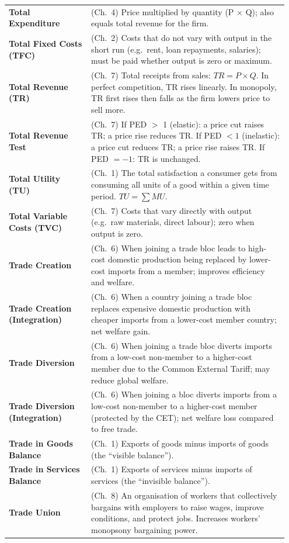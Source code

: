 \documentclass[11pt, a4paper, twoside]{book}
\begin{document}
\begin{longtable}{@{}>{\RaggedRight\arraybackslash}p{0.28\linewidth}>{\RaggedRight\arraybackslash}p{0.67\linewidth}@{}}
\textbf{Total Expenditure} & (Ch.~4) Price multiplied by quantity (P $\times$ Q); also equals total revenue for the firm. \\
\textbf{Total Fixed Costs (TFC)} & (Ch.~2) Costs that do not vary with output in the short run (e.g.\ rent, loan repayments, salaries); must be paid whether output is zero or maximum. \\
\textbf{Total Revenue (TR)} & (Ch.~7) Total receipts from sales: $TR = P \times Q$. In perfect competition, TR rises linearly. In monopoly, TR first rises then falls as the firm lowers price to sell more. \\
\textbf{Total Revenue Test} & (Ch.~7) If PED $>$ 1 (elastic): a price cut raises TR; a price rise reduces TR. If PED $< 1$ (inelastic): a price cut reduces TR; a price rise raises TR. If PED $= -1$: TR is unchanged. \\
\textbf{Total Utility (TU)} & (Ch.~1) The total satisfaction a consumer gets from consuming all units of a good within a given time period. $TU = \sum MU$. \\
\textbf{Total Variable Costs (TVC)} & (Ch.~7) Costs that vary directly with output (e.g.\ raw materials, direct labour); zero when output is zero. \\
\textbf{Trade Creation} & (Ch.~6) When joining a trade bloc leads to high-cost domestic production being replaced by lower-cost imports from a member; improves efficiency and welfare. \\
\textbf{Trade Creation (Integration)} & (Ch.~6) When a country joining a trade bloc replaces expensive domestic production with cheaper imports from a lower-cost member country; net welfare gain. \\
\textbf{Trade Diversion} & (Ch.~6) When joining a trade bloc diverts imports from a low-cost non-member to a higher-cost member due to the Common External Tariff; may reduce global welfare. \\
\textbf{Trade Diversion (Integration)} & (Ch.~6) When joining a bloc diverts imports from a low-cost non-member to a higher-cost member (protected by the CET); net welfare loss compared to free trade. \\
\textbf{Trade in Goods Balance} & (Ch.~1) Exports of goods minus imports of goods (the ``visible balance''). \\
\textbf{Trade in Services Balance} & (Ch.~1) Exports of services minus imports of services (the ``invisible balance''). \\
\textbf{Trade Union} & (Ch.~8) An organisation of workers that collectively bargains with employers to raise wages, improve conditions, and protect jobs. Increases workers' monopsony bargaining power. \\

\end{longtable}
\end{document}

